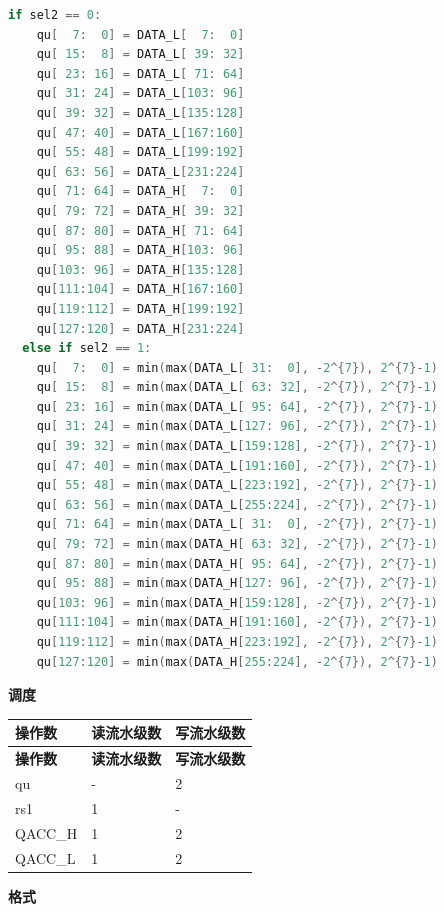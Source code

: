 \begin{lstlisting}[language=C, escapechar=@]
  if sel2 == 0:
    qu[  7:  0] = DATA_L[  7:  0]
    qu[ 15:  8] = DATA_L[ 39: 32]
    qu[ 23: 16] = DATA_L[ 71: 64]
    qu[ 31: 24] = DATA_L[103: 96]
    qu[ 39: 32] = DATA_L[135:128]
    qu[ 47: 40] = DATA_L[167:160]
    qu[ 55: 48] = DATA_L[199:192]
    qu[ 63: 56] = DATA_L[231:224]
    qu[ 71: 64] = DATA_H[  7:  0]
    qu[ 79: 72] = DATA_H[ 39: 32]
    qu[ 87: 80] = DATA_H[ 71: 64]
    qu[ 95: 88] = DATA_H[103: 96]
    qu[103: 96] = DATA_H[135:128]
    qu[111:104] = DATA_H[167:160]
    qu[119:112] = DATA_H[199:192]
    qu[127:120] = DATA_H[231:224]
  else if sel2 == 1:
    qu[  7:  0] = min(max(DATA_L[ 31:  0], -2^{7}), 2^{7}-1)
    qu[ 15:  8] = min(max(DATA_L[ 63: 32], -2^{7}), 2^{7}-1)
    qu[ 23: 16] = min(max(DATA_L[ 95: 64], -2^{7}), 2^{7}-1)
    qu[ 31: 24] = min(max(DATA_L[127: 96], -2^{7}), 2^{7}-1)
    qu[ 39: 32] = min(max(DATA_L[159:128], -2^{7}), 2^{7}-1)
    qu[ 47: 40] = min(max(DATA_L[191:160], -2^{7}), 2^{7}-1)
    qu[ 55: 48] = min(max(DATA_L[223:192], -2^{7}), 2^{7}-1)
    qu[ 63: 56] = min(max(DATA_L[255:224], -2^{7}), 2^{7}-1)
    qu[ 71: 64] = min(max(DATA_L[ 31:  0], -2^{7}), 2^{7}-1)
    qu[ 79: 72] = min(max(DATA_H[ 63: 32], -2^{7}), 2^{7}-1)
    qu[ 87: 80] = min(max(DATA_H[ 95: 64], -2^{7}), 2^{7}-1)
    qu[ 95: 88] = min(max(DATA_H[127: 96], -2^{7}), 2^{7}-1)
    qu[103: 96] = min(max(DATA_H[159:128], -2^{7}), 2^{7}-1)
    qu[111:104] = min(max(DATA_H[191:160], -2^{7}), 2^{7}-1)
    qu[119:112] = min(max(DATA_H[223:192], -2^{7}), 2^{7}-1)
    qu[127:120] = min(max(DATA_H[255:224], -2^{7}), 2^{7}-1)

\end{lstlisting}

\textbf{调度}\\
\begin{longtable}[c]{|l|l|l|}
    \hline
    \rowcolor{lightgray}
    \textbf{操作数} & \textbf{读流水级数} & \textbf{写流水级数} \\\hline
    \endfirsthead
    \hline
    \rowcolor{lightgray}
     \textbf{操作数} & \textbf{读流水级数} & \textbf{写流水级数} \\\hline
    \endhead
    \hline
    \endfoot

  qu & - & 2 \\\hline
  rs1 & 1 & - \\\hline
  QACC\_H & 1 & 2 \\\hline
  QACC\_L & 1 & 2

\end{longtable}

\textbf{格式}\\

